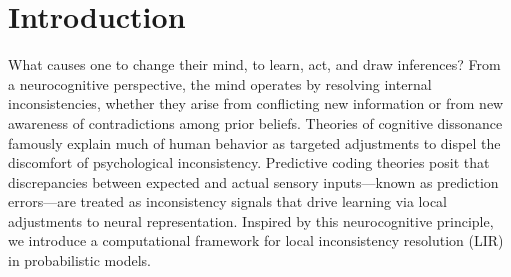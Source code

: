 \documentclass[twoside]{article}
\let\cite\citep
\theoremstyle{plain}
\theoremstyle{definition}
\theoremstyle{remark}
\newcommand\commentout[1]{} %
\begin{document}
\section{Introduction}
What causes one to change their mind, to learn, act, and draw inferences? 
From a neurocognitive perspective, the mind operates by resolving internal inconsistencies, whether they arise from conflicting new information or from new awareness of contradictions among prior beliefs.
Theories of cognitive dissonance \cite{festinger1962cognitive} famously explain much of human behavior as targeted adjustments to dispel the discomfort of psychological inconsistency. 
Predictive coding theories \cite{rao1999predictive,friston2005theory} posit that discrepancies between expected and actual sensory inputs---known as prediction errors---are treated as inconsistency signals that drive learning via local adjustments to neural representation.
% 
Inspired by this neurocognitive principle, we introduce a computational framework for local inconsistency resolution (LIR) in probabilistic models.
\commentout{
    The key idea is simple: rather than resolving all inconsistencies in a belief system globally (which may be intractable), we iteratively identify and locally reduce inconsistency over a subset of variables using only parameters under direct control. This mirrors how both human cognition and neural systems operate under limited attention and bounded control, often correcting inconsistencies in one area while remaining unaware of or unable to act on others 
   \todo{cite}.}
\end{document}

